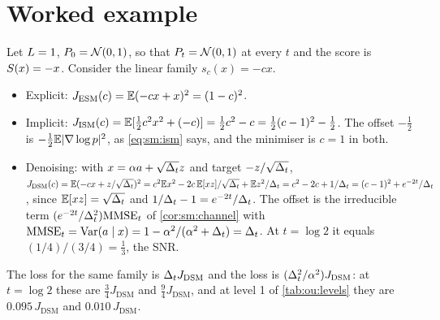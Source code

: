 
\section{Worked example}
\label{sec:sm:example}

\begin{example}
\label{ex:sm:gaussian}
Let $L=1$, $P_0=\mathcal{N}\!\left(0,1\right)$, so that $P_t=\mathcal{N}\!\left(0,1\right)$ at every $t$ and the score is
$S(x)=-x$. Consider the linear family $s_c(x)=-cx$.
\begin{itemize}
\item Explicit: $J_{\mathrm{ESM}}(c)=\mathbb{E}(-cx+x)^2=(1-c)^2$.
\item Implicit: $J_{\mathrm{ISM}}(c)=\mathbb{E}[\tfrac12c^2x^2+(-c)]=\tfrac12c^2-c=\tfrac12(c-1)^2-\tfrac12$.
  The offset $-\tfrac12$ is $-\tfrac12\mathbb{E}|\nabla\log p|^2$, as \cref{eq:sm:ism} says,
  and the minimiser is $c=1$ in both.
\item Denoising: with $x=\alpha a+\sqrt{\Delta_t}z$ and target $-z/\sqrt{\Delta_t}$,
  $J_{\mathrm{DSM}}(c)=\mathbb{E}(-cx+z/\sqrt{\Delta_t})^2=c^2\mathbb{E} x^2-2c\,\mathbb{E}[xz]/\sqrt{\Delta_t}+\mathbb{E} z^2/\Delta_t
  =c^2-2c+1/\Delta_t=(c-1)^2+e^{-2t}/\Delta_t$, since $\mathbb{E}[xz]=\sqrt{\Delta_t}$ and $1/\Delta_t-1=e^{-2t}/\Delta_t$.
  The offset is the irreducible term $(e^{-2t}/\Delta_t^2)\mathrm{MMSE}_t$ of
  \cref{cor:sm:channel} with $\mathrm{MMSE}_t=\operatorname{Var}(a\mid x)=1-\alpha^2/(\alpha^2+\Delta_t)=\Delta_t$.
  At $t=\log2$ it equals $(1/4)/(3/4)=\tfrac13$, the SNR.
\end{itemize}
The  loss for the same family is $\Delta_t J_{\mathrm{DSM}}$ and the 
loss is $(\Delta_t^2/\alpha^2)J_{\mathrm{DSM}}$: at $t=\log2$ these are $\tfrac34J_{\mathrm{DSM}}$
and $\tfrac94J_{\mathrm{DSM}}$, and at level 1 of \cref{tab:ou:levels} they are
$0.095\,J_{\mathrm{DSM}}$ and $0.010\,J_{\mathrm{DSM}}$.
\end{example}

